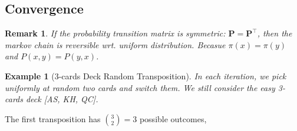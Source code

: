\documentclass[red]{beamer}
\theoremstyle{mystyle}
\newtheorem*{remark}{Remark}
\newtheorem*{ex}{Example}
\begin{document}
\subsection{Convergence}

\frame
{
\begin{remark}
If the probability transition matrix is symmetric: $\bm{P}=\bm{P}^{\top}$, then the markov chain is reversible wrt. uniform distribution. Becasue $\pi(x)=\pi(y)$ and $P(x,y)=P(y,x)$.
\end{remark}

\begin{ex}[3-cards Deck Random Transposition] 
In each iteration, we pick uniformly at random two cards and switch them. We still consider the easy 3-cards deck [AS, KH, QC].
\end{ex}
The first transposition has $\binom{3}{2}=3$ possible outcomes,
\begin{center}
~~~~~~~~\\
\end{center}
}
\end{document}
